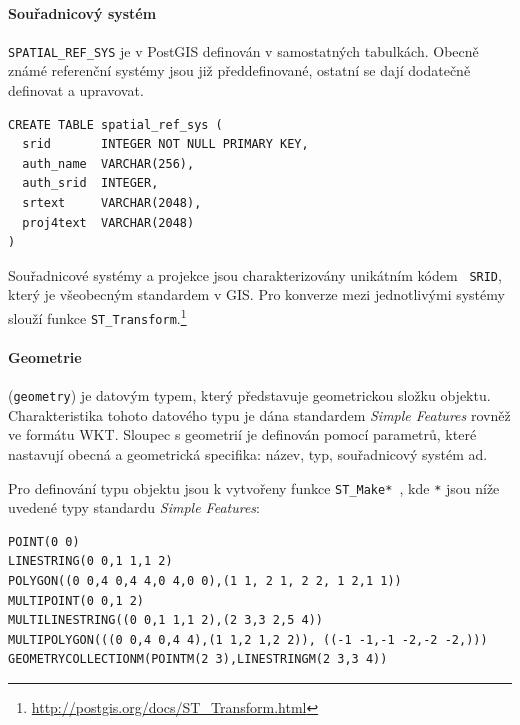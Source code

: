 \documentclass[a4paper,12pt,oneside]{report}
\begin{document}
\paragraph*{Souřadnicový systém} \texttt{SPATIAL\_REF\_SYS} je v
PostGIS definován v samostatných tabulkách. Obecně známé referenční
systémy jsou již předdefinované, ostatní se dají dodatečně definovat a
upravovat.

\begin{verbatim}
CREATE TABLE spatial_ref_sys (
  srid       INTEGER NOT NULL PRIMARY KEY,
  auth_name  VARCHAR(256),
  auth_srid  INTEGER,
  srtext     VARCHAR(2048),
  proj4text  VARCHAR(2048)
)
\end{verbatim}

Souřadnicové systémy a projekce jsou charakterizovány unikátním kódem
\texttt{   \acs{SRID}}, který je všeobecným standardem v GIS. Pro
konverze mezi jednotlivými systémy slouží funkce
\texttt{ST\_Transform}.\footnote{\url{http://postgis.org/docs/ST_Transform.html}}


\paragraph*{Geometrie} (\texttt{geometry}) je datovým typem, který
představuje geometrickou složku objektu.  Charakteristika tohoto
datového typu je dána standardem \textit{Simple Features} rovněž ve formátu
   \acs{WKT}.  Sloupec s geometrií je definován pomocí parametrů, které
nastavují obecná a geometrická specifika: název, typ, souřadnicový
systém ad.

Pro definování typu objektu jsou k vytvořeny funkce \texttt{ST\_Make*
}, kde \texttt{*} jsou níže uvedené typy standardu \textit{Simple
  Features}:


\begin{verbatim}
POINT(0 0)                                               
LINESTRING(0 0,1 1,1 2)                                       
POLYGON((0 0,4 0,4 4,0 4,0 0),(1 1, 2 1, 2 2, 1 2,1 1))          
MULTIPOINT(0 0,1 2)                                              
MULTILINESTRING((0 0,1 1,1 2),(2 3,3 2,5 4))                       
MULTIPOLYGON(((0 0,4 0,4 4),(1 1,2 1,2 2)), ((-1 -1,-1 -2,-2 -2,))) 
GEOMETRYCOLLECTIONM(POINTM(2 3),LINESTRINGM(2 3,3 4))                
\end{verbatim}
\end{document}
